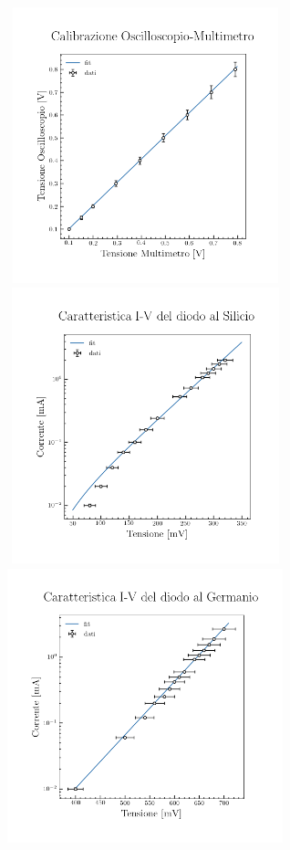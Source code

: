 \documentclass{amsart}
\begin{document}
    \begin{center}
        \includegraphics[width = 8cm, height = 8cm]{calibrazione/grafico_calibrazione.png}\\
        \vspace{0.5cm}
        \includegraphics[width = 8cm, height = 8cm]{silicio/grafico_silicio.png}
        \hspace{0.1cm}
        \includegraphics[width = 8cm, height = 8cm]{germanio/grafico_germanio.png}
    \end{center}
\end{document}
